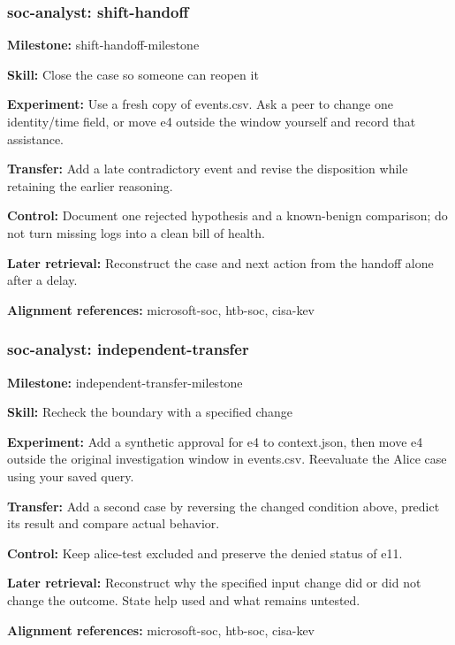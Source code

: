 \subsubsection{soc-analyst: shift-handoff}
\noindent\textbf{Milestone:} shift-handoff-milestone\par
\noindent\textbf{Skill:} Close the case so someone can reopen it\par
\noindent\textbf{Experiment:} Use a fresh copy of events.csv. Ask a peer to change one identity/time field, or move e4 outside the window yourself and record that assistance.\par
\noindent\textbf{Transfer:} Add a late contradictory event and revise the disposition while retaining the earlier reasoning.\par
\noindent\textbf{Control:} Document one rejected hypothesis and a known-benign comparison; do not turn missing logs into a clean bill of health.\par
\noindent\textbf{Later retrieval:} Reconstruct the case and next action from the handoff alone after a delay.\par
\noindent\textbf{Alignment references:} microsoft-soc, htb-soc, cisa-kev\par
\subsubsection{soc-analyst: independent-transfer}
\noindent\textbf{Milestone:} independent-transfer-milestone\par
\noindent\textbf{Skill:} Recheck the boundary with a specified change\par
\noindent\textbf{Experiment:} Add a synthetic approval for e4 to context.json, then move e4 outside the original investigation window in events.csv. Reevaluate the Alice case using your saved query.\par
\noindent\textbf{Transfer:} Add a second case by reversing the changed condition above, predict its result and compare actual behavior.\par
\noindent\textbf{Control:} Keep alice-test excluded and preserve the denied status of e11.\par
\noindent\textbf{Later retrieval:} Reconstruct why the specified input change did or did not change the outcome. State help used and what remains untested.\par
\noindent\textbf{Alignment references:} microsoft-soc, htb-soc, cisa-kev\par
